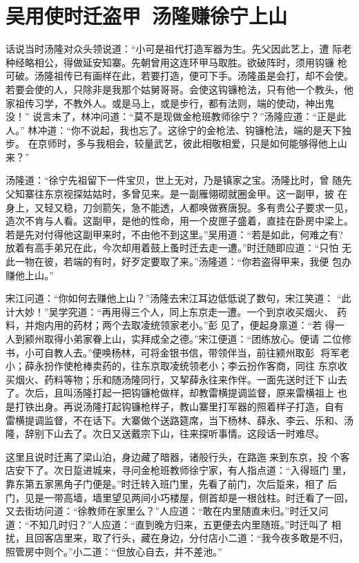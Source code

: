\chapter{吴用使时迁盗甲~汤隆赚徐宁上山}

话说当时汤隆对众头领说道：“小可是祖代打造军器为生。先父因此艺上，遭
际老种经略相公，得做延安知寨。先朝曾用这连环甲马取胜。欲破阵时，须用钩镰
枪可破。汤隆祖传已有画样在此，若要打造，便可下手。汤隆虽是会打，却不会使。
若要会使的人，只除非是我那个姑舅哥哥。会使这钩镰枪法，只有他一个教头，他
家祖传习学，不教外人。或是马上，或是步行，都有法则，端的使动，神出鬼没！”
说言未了，林冲问道：“莫不是现做金枪班教师徐宁？”汤隆应道：“正是此人。”
林冲道：“你不说起，我也忘了。这徐宁的金枪法、钩镰枪法，端的是天下独步。
在京师时，多与我相会，较量武艺，彼此相敬相爱，只是如何能够得他上山来？”

汤隆道：“徐宁先祖留下一件宝贝，世上无对，乃是镇家之宝。汤隆比时，曾
随先父知寨往东京视探姑姑时，多曾见来。是一副雁翎砌就圈金甲。这一副甲，披
在身上，又轻又稳，刀剑箭矢，急不能透，人都唤做赛唐猊。多有贵公子要求一见，
造次不肯与人看。这副甲，是他的性命，用一个皮匣子盛着，直挂在卧房中梁上。
若是先对付得他这副甲来时，不由他不到这里。”吴用道：“若是如此，何难之有?
放着有高手弟兄在此，今次却用着鼓上蚤时迁去走一遭。”时迁随即应道：“只怕
无此一物在彼，若端的有时，好歹定要取了来。”汤隆道：“你若盗得甲来，我便
包办赚他上山。”

宋江问道：“你如何去赚他上山？”汤隆去宋江耳边低低说了数句，宋江笑道：
“此计大妙！”吴学究道：“再用得三个人，同上东京走一遭。一个到京收买烟火、
药料，并炮内用的药材；两个去取凌统领家老小。”彭见了，便起身禀道：“若
得一人到颍州取得小弟家眷上山，实拜成全之德。”宋江便道：“团练放心。便请
二位修书，小可自教人去。”便唤杨林，可将金银书信，带领伴当，前往颍州取彭
将军老小；薛永扮作使枪棒卖药的，往东京取凌统领老小；李云扮作客商，同往
东京收买烟火、药料等物；乐和随汤隆同行，又挈薛永往来作伴。一面先送时迁下
山去了。次后，且叫汤隆打起一把钩镰枪做样，却教雷横提调监督，原来雷横祖上
也是打铁出身。再说汤隆打起钩镰枪样子，教山寨里打军器的照着样子打造，自有
雷横提调监督，不在话下。大寨做个送路筵席，当下杨林、薛永、李云、乐和、汤
隆，辞别下山去了。次日又送戴宗下山，往来探听事情。这段话一时难尽。

这里且说时迁离了梁山泊，身边藏了暗器，诸般行头，在路迤来到东京，投
个客店安下了。次日踅进城来，寻问金枪班教师徐宁家，有人指点道：“入得班门
里，靠东第五家黑角子门便是。”时迁转入班门里，先看了前门，次后踅来，相了
后门，见是一带高墙，墙里望见两间小巧楼屋，侧首却是一根戗柱。时迁看了一回，
又去街坊问道：“徐教师在家里么？”人应道：“敢在内里随直未归。”时迁又问
道：“不知几时归？”人应道：“直到晚方归来，五更便去内里随班。”时迁叫了
相扰，且回客店里来，取了行头，藏在身边，分付店小二道：“我今夜多敢是不归，
照管房中则个。”小二道：“但放心自去，并不差池。”

